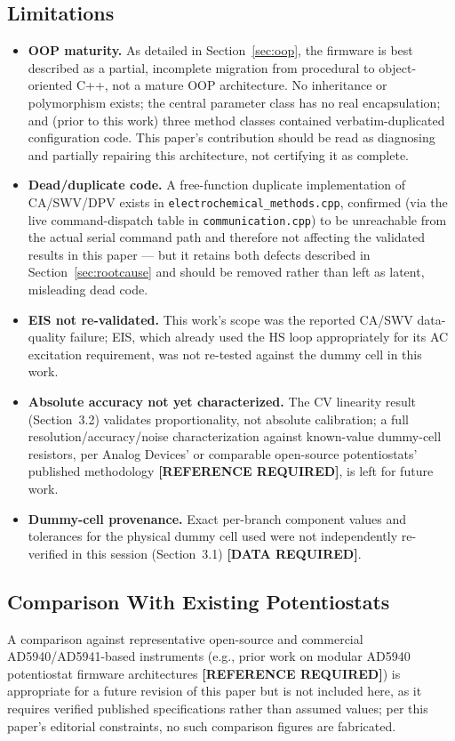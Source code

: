\documentclass[preprint,12pt]{elsarticle}
\begin{document}
\subsection{Limitations}
\label{sec:limitations}
\begin{itemize}
\item \textbf{OOP maturity.} As detailed in Section~\ref{sec:oop}, the firmware is best described as a partial, incomplete migration from procedural to object-oriented C++, not a mature OOP architecture. No inheritance or polymorphism exists; the central parameter class has no real encapsulation; and (prior to this work) three method classes contained verbatim-duplicated configuration code. This paper's contribution should be read as diagnosing and partially repairing this architecture, not certifying it as complete.
\item \textbf{Dead/duplicate code.} A free-function duplicate implementation of CA/SWV/DPV exists in \texttt{electrochemical\_methods.cpp}, confirmed (via the live command-dispatch table in \texttt{communication.cpp}) to be unreachable from the actual serial command path and therefore not affecting the validated results in this paper --- but it retains both defects described in Section~\ref{sec:rootcause} and should be removed rather than left as latent, misleading dead code.
\item \textbf{EIS not re-validated.} This work's scope was the reported CA/SWV data-quality failure; EIS, which already used the HS loop appropriately for its AC excitation requirement, was not re-tested against the dummy cell in this work.
\item \textbf{Absolute accuracy not yet characterized.} The CV linearity result (Section~3.2) validates proportionality, not absolute calibration; a full resolution/accuracy/noise characterization against known-value dummy-cell resistors, per Analog Devices' or comparable open-source potentiostats' published methodology \textbf{[REFERENCE REQUIRED]}, is left for future work.
\item \textbf{Dummy-cell provenance.} Exact per-branch component values and tolerances for the physical dummy cell used were not independently re-verified in this session (Section~3.1) \textbf{[DATA REQUIRED]}.
\end{itemize}

\subsection{Comparison With Existing Potentiostats}
A comparison against representative open-source and commercial AD5940/AD5941-based instruments (e.g., prior work on modular AD5940 potentiostat firmware architectures \textbf{[REFERENCE REQUIRED]}) is appropriate for a future revision of this paper but is not included here, as it requires verified published specifications rather than assumed values; per this paper's editorial constraints, no such comparison figures are fabricated.
\end{document}
